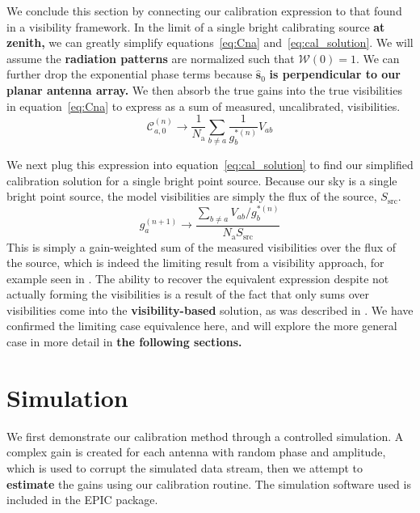 \documentclass[a4paper,fleqn,usenatbib]{../mnras}
\newcommand{\Nant}{\ensuremath{N_{\mathrm{a}}}}
\newcommand{\spix}{\ensuremath{\hat{\mathbf{s}}_{0}}}
\begin{document}
We conclude this section by connecting our calibration expression to that found in a visibility 
framework. In the limit of a single bright calibrating source \textbf{at zenith,} we can greatly 
simplify equations~\ref{eq:Cna} and~\ref{eq:cal_solution}. We will assume the \textbf{radiation patterns} are 
normalized such that $\mathcal{W}(0)=1$. We can further drop the exponential phase terms 
because $\spix$ \textbf{is perpendicular to our planar antenna array.} We then absorb the true gains into the true visibilities in 
equation~\ref{eq:Cna} to express as a sum of measured, uncalibrated, visibilities.
\begin{equation}
\mathcal{C}^{(n)}_{a,0} \rightarrow \frac{1}{\Nant}\sum_{b\ne a} \frac{1}{g^{*(n)}_b} V_{ab}
\end{equation}

We next plug this expression into equation~\ref{eq:cal_solution} to find our simplified 
calibration solution for a single bright point source. Because our sky is a single bright point 
source, the model visibilities are simply the flux of the source, $S_{\mathrm{src}}$.
\begin{equation}
g^{(n+1)}_a \rightarrow \frac{\sum_{b\ne a}  V_{ab}/g^{*(n)}_b}{\Nant S_{\mathrm{src}}}
\end{equation}
This is simply a gain-weighted sum of the measured visibilities over the flux of the source, 
which is indeed the limiting result from a visibility approach, for example seen in \citealt{mit08}. 
The ability to recover the equivalent expression despite not actually forming the visibilities is a 
result of the fact that only sums over visibilities come into the \textbf{visibility-based} solution, as was described in 
\citealt{mor11}. We have confirmed the limiting case equivalence here, and will explore the 
more general case in more detail in \textbf{the following sections.}

\section{Simulation}\label{sec:sim}
We first demonstrate our calibration method through a controlled simulation. A complex gain is 
created for each antenna with random phase and amplitude, which is used to corrupt the 
simulated data stream, then we attempt to \textbf{estimate} the gains using our calibration routine. The 
simulation software used is included in the EPIC package.
\end{document}
